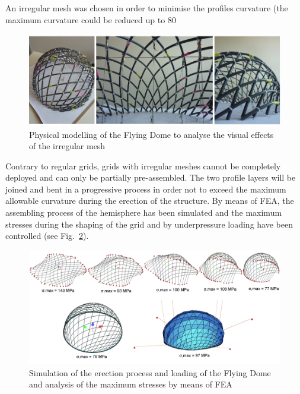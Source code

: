 An irregular mesh was chosen in order to minimise the profiles curvature (the maximum curvature could be reduced up to 80%

\begin{figure}[ht]
\centering
\includegraphics[width=1.0\linewidth]{images/Renderings_Modell/Modell.JPG}
\caption{Physical modelling of the Flying Dome to analyse the visual effects of the irregular mesh}
\label{fig:Modell}
\end{figure}

Contrary to regular grids, grids with irregular meshes cannot be completely deployed and can only be partially pre-assembled. The two profile layers will be joined and bent in a progressive process in order not to exceed the maximum allowable curvature during the erection of the structure. By means of FEA, the assembling process of the hemisphere has been simulated and the maximum stresses during the shaping of the grid and by underpressure loading have been controlled (see Fig.~\ref{fig:FEMGlobal}). 

\begin{figure}[ht]
\centering
\includegraphics[width=1.0\linewidth]{images/CaseStudies_Irregular/FEMGlobal.png}
\caption{Simulation of the erection process and loading of the Flying Dome and analysis of the maximum stresses by means of FEA}
\label{fig:FEMGlobal}
\end{figure}








